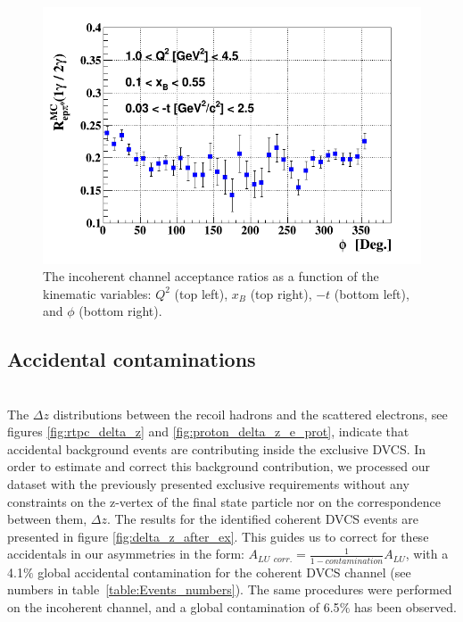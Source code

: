\begin{figure}[tp]
\includegraphics[scale=0.30]{fig_dvcs/epgamma_eppi0_Phi.png}
\caption{The incoherent channel acceptance ratios as a function of the 
kinematic variables: $Q^{2}$ (top left), $x_{B}$ (top right), $-t$ (bottom 
left), and $\phi$ (bottom right).  }
\label{fig:incoh_acceptance _ratios}
\end{figure}

\subsection{Accidental contaminations}
~\\

The $\Delta z$ distributions between the recoil hadrons and the scattered 
electrons, see figures \ref{fig:rtpc_delta_z} and 
\ref{fig:proton_delta_z_e_prot}, indicate that accidental background events are 
contributing inside the exclusive DVCS. In order to estimate and correct 
this background contribution, we processed our dataset with the previously 
presented exclusive requirements without any constraints on the z-vertex of the 
final state particle nor on the correspondence between them, $\Delta z$. The 
results for the identified coherent DVCS events are presented in figure 
\ref{fig:delta_z_after_ex}. This guides us to correct for these accidentals in 
our asymmetries in the form: $ A_{LU~~corr.} = \frac{1}{1 - contamination} 
A_{LU}$, with a 4.1$\%$ global accidental contamination for the coherent DVCS 
channel (see numbers in table~\ref{table:Events_numbers}). The same procedures 
were performed on the incoherent channel, and a 
global contamination of 6.5$\%$ has been observed.\\

